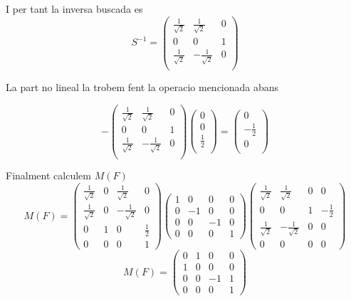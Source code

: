 \documentclass[12pt, a4papre]{article}
\begin{document}
	I per tant la inversa buscada es
	\[
	S^{-1}=
	\begin{pmatrix}
		\frac{1}{\sqrt{2}}	 & \frac{1}{\sqrt{2}}	 & 0\\
		0 				& 0 				& 1\\
		\frac{1}{\sqrt{2}}	& -\frac{1}{\sqrt{2}}	& 0\\
	\end{pmatrix}
	\]
	
	La part no lineal la trobem fent la operacio mencionada abans
	
	\[
	-
	\begin{pmatrix}
		\frac{1}{\sqrt{2}}	 & \frac{1}{\sqrt{2}}	 & 0\\
		0 				& 0 				& 1\\
		\frac{1}{\sqrt{2}}	& -\frac{1}{\sqrt{2}}	& 0\\
	\end{pmatrix}
	\begin{pmatrix}
		0\\
		0\\
		\frac{1}{2}\\
	\end{pmatrix}
	=
	\begin{pmatrix}
		0\\
		-\frac{1}{2}\\
		0\\
	\end{pmatrix}
	\]
	
	\newpage
	Finalment calculem $M(F)$
	\[
	M(F)=
	\begin{pmatrix}
		\frac{1}{\sqrt{2}} 	&	0	&	\frac{1}{\sqrt{2}} 	&	0\\
		\frac{1}{\sqrt{2}} 	&	0	&	-\frac{1}{\sqrt{2}}	&	0\\
		0				&	1  	&	0				&	\frac{1}{2}\\
		0				&	0	& 	0				&	1
	\end{pmatrix}
	\begin{pmatrix}
		1	&	0	&	0	&	0\\
		0	&	-1	&	0	&	0\\
		0	&	0  	&	-1	&	0\\
		0	&	0	& 	0	&	1
	\end{pmatrix}
	\begin{pmatrix}
		\frac{1}{\sqrt{2}}	 & \frac{1}{\sqrt{2}}	& 0	&0\\
		0 			& 0 				& 1	&-\frac{1}{2}\\
		\frac{1}{\sqrt{2}}	& -\frac{1}{\sqrt{2}}	& 0	&0\\
		0			&0				&0	&0
	\end{pmatrix}
	\]
	\[
	M(F)=
	\begin{pmatrix}
		0	&	1	&	0	&	0\\
		1	&	0	&	0	&	0\\
		0	&	0  	&	-1	&	1\\
		0	&	0	& 	0	&	1
	\end{pmatrix}
	\]
	
\end{document}
